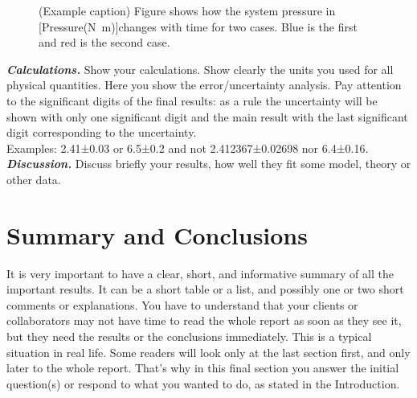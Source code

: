 \documentclass{scrartcl}
\begin{document}
\begin{figure}[ht] %
    \centering
    \caption{(Example caption) Figure shows how the system pressure in [Pressure(\unit{\newton\metre})]changes with time for two cases.
    Blue is the first and red is the second case.}
    \label{fig:merkimiði_myndar}
\end{figure}

\textbf{\textit{Calculations.}}
Show your calculations.
Show clearly the units you used for all physical quantities.
Here you show the error/uncertainty analysis.
Pay attention to the significant digits of the final results:
as a rule the uncertainty will be shown with only one significant digit and the main result with the last significant digit corresponding to the uncertainty.\\
Examples: 2.41±0.03 or 6.5±0.2 and not 2.412367±0.02698 nor 6.4±0.16.
\textbf{\textit{Discussion.}} 
Discuss briefly your results, how well they fit some model, theory or other data.

\section{Summary and Conclusions} %

It is very important to have a clear, short, and informative summary of all the important results.
It can be a short table or a list, and possibly one or two short comments or explanations.
You have to understand that your clients or collaborators may not have time to read the whole report as soon as they see it, but they need the results or the conclusions immediately.
This is a typical situation in real life.
Some readers will look only at the last section first, and only later to the whole report.
That’s why in this final section you answer the initial question(s) or respond to what you wanted to do, as stated in the Introduction\cite{abook}.
\end{document}
